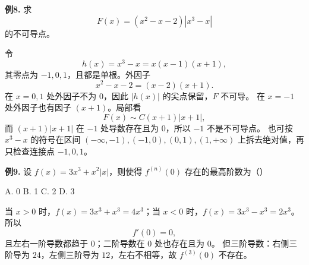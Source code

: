 \begin{problemblock}
\textbf{例8.} 求
\[
F(x)=(x^2-x-2)|x^3-x|
\]
的不可导点。
\end{problemblock}
\begin{solutionblock}
令
\[
h(x)=x^3-x=x(x-1)(x+1),
\]
其零点为 \(-1,0,1\)，且都是单根。外因子
\[
x^2-x-2=(x-2)(x+1).
\]
在 \(x=0,1\) 处外因子不为 0，因此 \(|h(x)|\) 的尖点保留，\(F\) 不可导。
在 \(x=-1\) 处外因子也有因子 \((x+1)\)。局部看
\[
F(x)\sim C(x+1)|x+1|,
\]
而 \((x+1)|x+1|\) 在 \(-1\) 处导数存在且为 0，所以 \(-1\) 不是不可导点。
也可按 \(x^3-x\) 的符号在区间 \((-
\infty,-1),(-1,0),(0,1),(1,+\infty)\) 上拆去绝对值，再只检查连接点 \(-1,0,1\)。
\end{solutionblock}

\begin{problemblock}
\textbf{例9.} 设 \(f(x)=3x^3+x^2|x|\)，则使得 \(f^{(n)}(0)\) 存在的最高阶数为（\quad）

A. 0 \qquad B. 1 \qquad C. 2 \qquad D. 3
\end{problemblock}
\begin{solutionblock}
当 \(x>0\) 时，\(f(x)=3x^3+x^3=4x^3\)；当 \(x<0\) 时，\(f(x)=3x^3-x^3=2x^3\)。
所以
\[
f'(0)=0,
\]
且左右一阶导数都趋于 0；二阶导数在 0 处也存在且为 0。
但三阶导数：右侧三阶导为 \(24\)，左侧三阶导为 \(12\)，左右不相等，故 \(f^{(3)}(0)\) 不存在。
\end{solutionblock}

